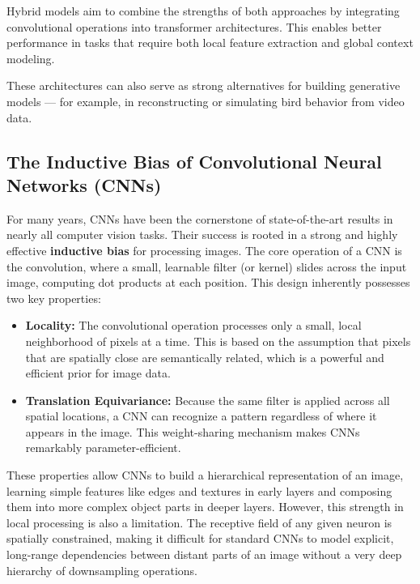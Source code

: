 Hybrid models aim to combine the strengths of both approaches by integrating convolutional operations into transformer architectures. This enables better performance in tasks that require both local feature extraction and global context modeling.

These architectures can also serve as strong alternatives for building generative models — for example, in reconstructing or simulating bird behavior from video data.

\subsection{The Inductive Bias of Convolutional Neural Networks (CNNs)}
For many years, CNNs have been the cornerstone of state-of-the-art results in nearly all computer vision tasks. Their success is rooted in a strong and highly effective \textbf{inductive bias} for processing images. The core operation of a CNN is the convolution, where a small, learnable filter (or kernel) slides across the input image, computing dot products at each position. This design inherently possesses two key properties:

\begin{itemize}
    \item \textbf{Locality:} The convolutional operation processes only a small, local neighborhood of pixels at a time. This is based on the assumption that pixels that are spatially close are semantically related, which is a powerful and efficient prior for image data.
    \item \textbf{Translation Equivariance:} Because the same filter is applied across all spatial locations, a CNN can recognize a pattern regardless of where it appears in the image. This weight-sharing mechanism makes CNNs remarkably parameter-efficient.
\end{itemize}

These properties allow CNNs to build a hierarchical representation of an image, learning simple features like edges and textures in early layers and composing them into more complex object parts in deeper layers. However, this strength in local processing is also a limitation. The receptive field of any given neuron is spatially constrained, making it difficult for standard CNNs to model explicit, long-range dependencies between distant parts of an image without a very deep hierarchy of downsampling operations.

